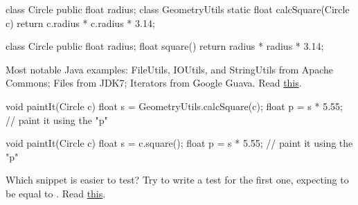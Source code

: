 \documentclass{article}
\begin{document}

\pptToc


\begin{pptWide}{2}
{\small\begin{ffcode}
class Circle {
  public float radius;
}
class GeometryUtils {
  static float calcSquare(Circle c) {
    return c.radius * c.radius * 3.14;
  }
}
\end{ffcode}
}
\par\columnbreak\par
{\small\begin{ffcode}
class Circle {
  public float radius;
  float square() {
    return radius * radius * 3.14;
  }
}
\end{ffcode}
}
\end{pptWide}\par
Most notable Java examples:
FileUtils, IOUtils, and StringUtils from Apache Commons;
Files from JDK7;
Iterators from Google Guava.
Read \href{https://www.yegor256.com/2015/02/20/utility-classes-vs-functional-programming.html}{this}.
\plush{}


\begin{pptWide}{2}
{\small\begin{ffcode}
void paintIt(Circle c) {
  float s = GeometryUtils.calcSquare(c);
  float p = s * 5.55;
  // paint it using the "p"
}
\end{ffcode}
}
\par\columnbreak\par
{\small\begin{ffcode}
void paintIt(Circle c) {
  float s = c.square();
  float p = s * 5.55;
  // paint it using the "p"
}
\end{ffcode}
}
\end{pptWide}\par
Which snippet is easier to test? Try to write a test for the first one, expecting  to be equal to .
Read \href{https://www.yegor256.com/2014/05/05/oop-alternative-to-utility-classes.html}{this}.
\plush{}
\end{document}
